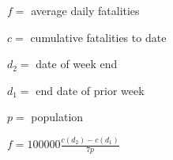 \documentclass[12pt,letterpaper,draft]{article}
\title{}
\begin{document}
$f=$ average daily fatalities

$c=$ cumulative fatalities to date

$d_2=$ date of week end

$d_1=$ end date of prior week

$p=$ population

$f=100000\frac{c(d_2)-c(d_1)}{7p}$
\end{document}
